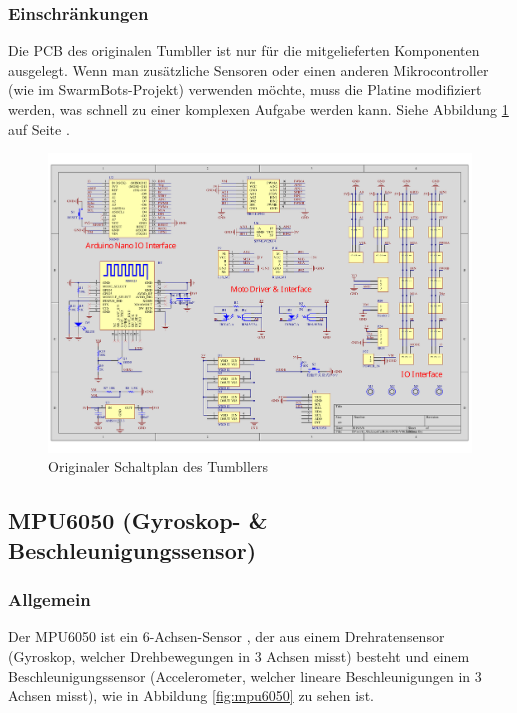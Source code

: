 \subsubsection{Einschränkungen}
Die PCB des originalen Tumbller ist nur für die mitgelieferten Komponenten ausgelegt.
%
Wenn man zusätzliche Sensoren oder einen anderen Mikrocontroller (wie im SwarmBots-Projekt) verwenden möchte,
muss die Platine modifiziert werden,
was schnell zu einer komplexen Aufgabe werden kann.
%
Siehe Abbildung \ref{fig:elegoo_tumbller_original_circuit} auf Seite \pageref{fig:elegoo_tumbller_original_circuit}.
%
\begin{figure}
    \includegraphics[width=\textwidth, center]{img/elegoo_tumbller_original_circuit.pdf}
    \caption{Originaler Schaltplan des Tumbllers }
    \label{fig:elegoo_tumbller_original_circuit}
\end{figure}
%
\newpage
\subsection{MPU6050 (Gyroskop- \& Beschleunigungssensor)}
%
\subsubsection{Allgemein}
Der MPU6050 ist ein 6-Achsen-Sensor \cite{adafruit-mpu6050},
der aus einem Drehratensensor (Gyroskop, welcher Drehbewegungen in 3 Achsen misst) besteht
und einem Beschleunigungssensor (Accelerometer, welcher lineare Beschleunigungen in 3 Achsen misst),
wie in Abbildung \ref{fig:mpu6050} zu sehen ist.
